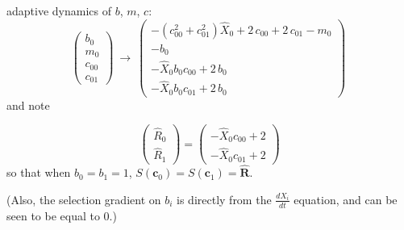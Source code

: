 \documentclass{article}
\begin{document}
adaptive dynamics of $b$, $m$, $c$:
\[\left(\begin{array}{c}
  b_{0}\\
  m_{0}\\
  c_{00}\\
  c_{01}
\end{array}\right) \
\to \
\left(\begin{array}{c}
  -{\left(c_{00}^{2} + c_{01}^{2}\right)} \hat{X}_{0} + 2 \, c_{00} + 2 \, c_{01} - m_{0}\\
  -b_{0}\\
  -\hat{X}_{0} b_{0} c_{00} + 2 \, b_{0}\\
  -\hat{X}_{0} b_{0} c_{01} + 2 \, b_{0}
\end{array}\right) \
\]
and note

\[
  \left(\begin{array}{c}
  \hat{R}_{0}\\
  \hat{R}_{1}
\end{array}\right) = \left(\begin{array}{c}
  -\hat{X}_{0} c_{00} + 2\\
  -\hat{X}_{0} c_{01} + 2
\end{array}\right)
\]
so that when $b_0=b_1=1$, $S(\mathbf{c}_0)=S(\mathbf{c}_1)=\hat{\mathbf{R}}$.

(Also, the selection gradient on $b_i$ is directly from the $\frac{dX_i}{dt}$ equation, and can be seen to be equal to 0.)
\end{document}

